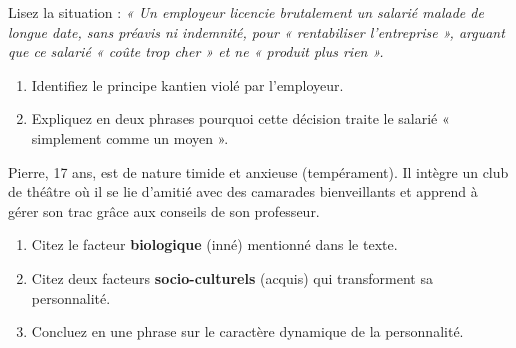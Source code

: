 \documentclass[11pt]{article}
\begin{document}
\begin{exercice}
Lisez la situation : \textit{« Un employeur licencie brutalement un salarié malade de longue date, sans préavis ni indemnité, pour « rentabiliser l'entreprise », arguant que ce salarié « coûte trop cher » et ne « produit plus rien ».}
\begin{enumerate}
    \item Identifiez le principe kantien violé par l'employeur.
    \item Expliquez en deux phrases pourquoi cette décision traite le salarié « simplement comme un moyen ».
\end{enumerate}
\end{exercice}

\begin{exercice}
Pierre, 17 ans, est de nature timide et anxieuse (tempérament). Il intègre un club de théâtre où il se lie d'amitié avec des camarades bienveillants et apprend à gérer son trac grâce aux conseils de son professeur.
\begin{enumerate}
    \item Citez le facteur \textbf{biologique} (inné) mentionné dans le texte.
    \item Citez deux facteurs \textbf{socio-culturels} (acquis) qui transforment sa personnalité.
    \item Concluez en une phrase sur le caractère dynamique de la personnalité.
\end{enumerate}
\end{exercice}
\end{document}

